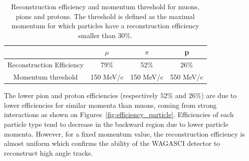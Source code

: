 \begin{table}[htb]
  \small
  \begin{center}
    \begin{tabular}{|c|c|c|c|}
      \hline
      \hline
      & $\mu$ & $\pi$ & p \\
      \hline
      Reconstruction Efficiency & 79\% & 52\% & 26\% \\
      Momentum threshold & 150 MeV/c & 150 MeV/c & 550 MeV/c \\
      \hline
      \hline
    \end{tabular}
    \caption{\label{tab:reconstructedparticles} Reconstruction efficiency and momentum threshold for muons, pions and protons. The threshold is defined as the maximal momentum for which particles have a reconstruction efficiency smaller than $30\%$.}
  \end{center}
\end{table}
 The lower pion and proton efficiencies (respectively $52\%$ and $26\%$) are due to lower efficiencies for similar momenta than muons, coming from strong interactions as shown on Figures~\ref{fig:efficiency_particle}. Efficiencies of each particle type tend to decrease in the backward region 
 due to lower particle momenta.
 However, for a fixed momentum value, the reconstruction efficiency is almost uniform which confirms the ability of the WAGASCI detector to reconstruct high angle tracks. 
